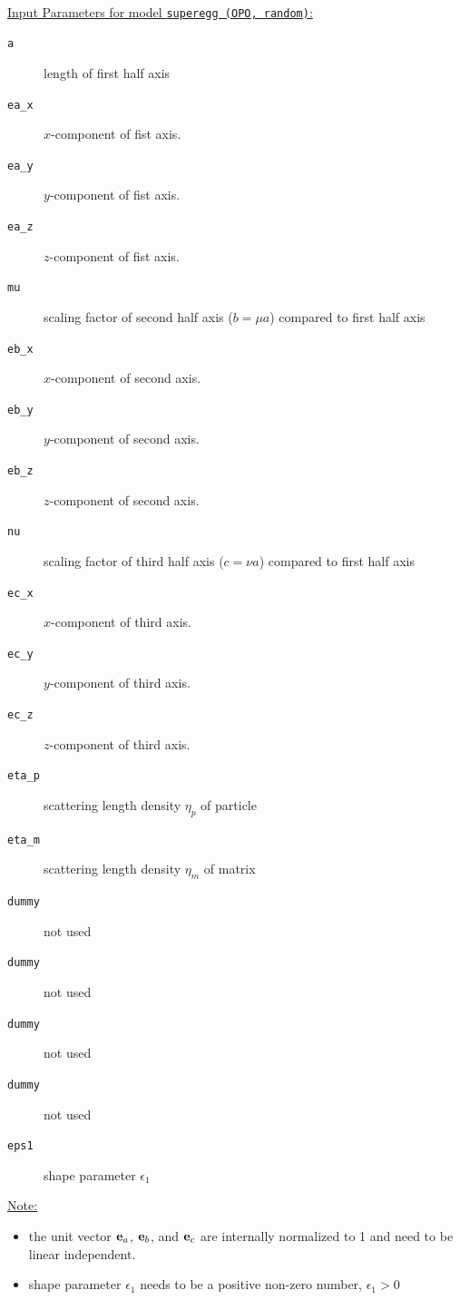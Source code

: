~\\
\uline{Input Parameters for model \texttt{superegg (OPO, random)}:}
\begin{description}
\item[\texttt{a}] length of first half axis
\item[\texttt{ea\_x}] $x$-component of fist axis.
\item[\texttt{ea\_y}] $y$-component of fist axis.
\item[\texttt{ea\_z}] $z$-component of fist axis.
\item[\texttt{mu}] scaling factor of second half axis ($b=\mu a$) compared to first half axis
\item[\texttt{eb\_x}] $x$-component of second axis.
\item[\texttt{eb\_y}] $y$-component of second axis.
\item[\texttt{eb\_z}] $z$-component of second axis.
\item[\texttt{nu}] scaling factor of third half axis ($c=\nu a$) compared to first half axis
\item[\texttt{ec\_x}] $x$-component of third axis.
\item[\texttt{ec\_y}] $y$-component of third axis.
\item[\texttt{ec\_z}] $z$-component of third axis.
\item[\texttt{eta\_p}] scattering length density $\eta_p$ of particle
\item[\texttt{eta\_m}] scattering length density $\eta_m$ of matrix
\item[\texttt{dummy}] not used
\item[\texttt{dummy}] not used
\item[\texttt{dummy}] not used
\item[\texttt{dummy}] not used
\item[\texttt{eps1}] shape parameter $\epsilon_1$
\end{description}

\noindent\uline{Note:}
\begin{itemize}
\item the unit vector ${\bf e}_a$, ${\bf e}_b$, and ${\bf e}_c$ are internally normalized to 1 and need to be linear independent.
\item shape parameter $\epsilon_1$ needs to be a positive non-zero number, $\epsilon_1>0$
\end{itemize}

\clearpage
